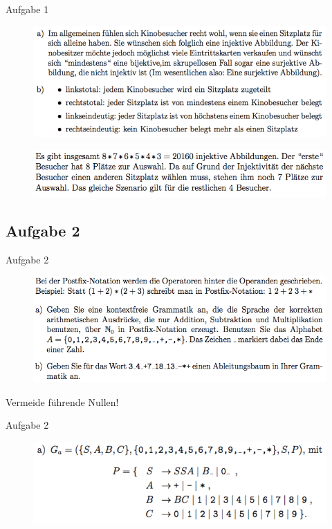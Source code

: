 \begin{frame}{Aufgabe 1}
\begin{figure}[h!]
		\centering
		\includegraphics[width=\textwidth]{2.png} 
	\end{figure}  
	\begin{figure}[h!]
		\centering
		\includegraphics[width=\textwidth]{3.png} 
	\end{figure}   
\end{frame}

\subsection{Aufgabe 2}
\begin{frame}{Aufgabe 2}
\begin{figure}[h!]
		\centering
		\includegraphics[width=\textwidth]{4.png} 
	\end{figure}     
Vermeide führende Nullen!
\end{frame}

\begin{frame}{Aufgabe 2}
\begin{figure}[h!]
		\centering
		\includegraphics[width=\textwidth]{5.png} 
	\end{figure}    
\end{frame}

